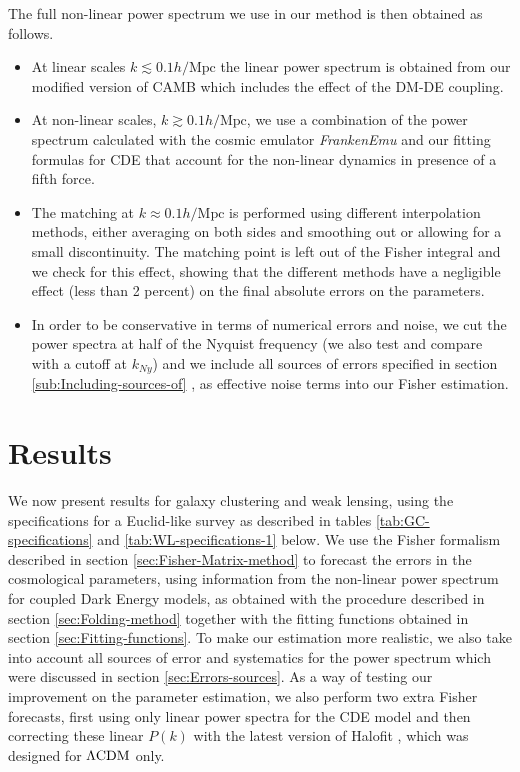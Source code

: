 The full non-linear power spectrum we use in our method is then obtained
as follows. 
\begin{itemize}
\item At linear scales $k\lesssim0.1h/\mbox{Mpc}$ the linear power spectrum
is obtained from our modified version of CAMB which includes the effect
of the DM-DE coupling. 
\item At non-linear scales, $k\gtrsim0.1h/\mbox{Mpc}$, we use a combination
of the power spectrum calculated with the cosmic emulator \emph{FrankenEmu
}and our fitting formulas for CDE that account for the non-linear
dynamics in presence of a fifth force. 
\item The matching at $k\approx0.1h/\mbox{Mpc}$ is performed using different
interpolation methods, either averaging on both sides and smoothing
out or allowing for a small discontinuity. The matching point is left
out of the Fisher integral and we check for this effect, showing that
the different methods have a negligible effect (less than 2 percent)
on the final absolute errors on the parameters. 
\item In order to be conservative in terms of numerical errors and noise,
we cut the power spectra at half of the Nyquist frequency (we also
test and compare with a cutoff at $k_{Ny}$) and we include all sources
of errors specified in section \ref{sub:Including-sources-of} , as
effective noise terms into our Fisher estimation. 
\end{itemize}

\section{\label{sec:GC-WL-Results}Results}

We now present results for galaxy clustering and weak lensing, using
the specifications for a Euclid-like survey as described in tables
\ref{tab:GC-specifications} and \ref{tab:WL-specifications-1} below.
We use the Fisher formalism described in section \ref{sec:Fisher-Matrix-method}
to forecast the errors in the cosmological parameters, using information
from the non-linear power spectrum for coupled Dark Energy models,
as obtained with the procedure described in section \ref{sec:Folding-method}
together with the fitting functions obtained in section \ref{sec:Fitting-functions}.
To make our estimation more realistic, we also take into account all
sources of error and systematics for the power spectrum which were
discussed in section \ref{sec:Errors-sources}. As a way of testing
our improvement on the parameter estimation, we also perform two extra
Fisher forecasts, first using only linear power spectra for the CDE
model and then correcting these linear $P(k)$ with the latest version
of Halofit \cite{takahashi_revising_2012}, which was designed for
$\Lambda\mathrm{CDM}$ only.

